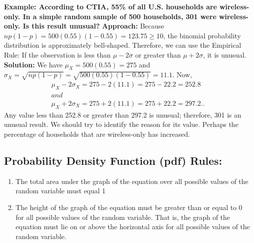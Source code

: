 \documentclass{report}
\begin{document}
      \pagebreak \bigbreak \noindent 
          \begin{mdframed}
        \textbf{Example: According to CTIA, 55\% of all U.S. households are wireless-only. In a simple random sample of 500 households, 301 were wireless-only. Is this result unusual?}
        \bigbreak \noindent 
        \textbf{Approach:}
        \bigbreak \noindent 
        Because $np(1-p) = 500(0.55)(1-0.55) = 123.75 \geq 10$, the binomial probability distribution is approximately bell-shaped. Therefore, we can use the Empirical Rule: If the observation is less than $\mu - 2\sigma$ or greater than $\mu + 2\sigma$, it is unusual.
        \bigbreak \noindent 
        \textbf{Solution:}
        We have $\mu_X = 500(0.55) = 275$ and $\sigma_X = \sqrt{np(1-p)} = \sqrt{500(0.55)(1-0.55)} = 11.1$. Now,
        \begin{align*}
            \mu_X - 2\sigma_X = 275 - 2(11.1) = 275 - 22.2 = 252.8\\ and\\ \mu_X + 2\sigma_X = 275 + 2(11.1) = 275 + 22.2 = 297.2.
        .\end{align*}
        \bigbreak \noindent 
        Any value less than 252.8 or greater than 297.2 is unusual; therefore, 301 is an unusual result. We should try to identify the reason for its value. Perhaps the percentage of households that are wireless-only has increased.
      \end{mdframed}

      \bigbreak \noindent \bigbreak \noindent 
      \subsection*{Probability Density Function (pdf) Rules:}
      \bigbreak \noindent 
        \begin{enumerate}
          \item The total area under the graph of the equation over all possible values of the random variable must equal 1
          \item The height of the graph of the equation must be greater than or equal to 0 for all possible values of the random variable. That is, the graph of the equation must lie on or above the horizontal axis for all possible values of the random variable.
        \end{enumerate}

      \pagebreak 
\end{document}
